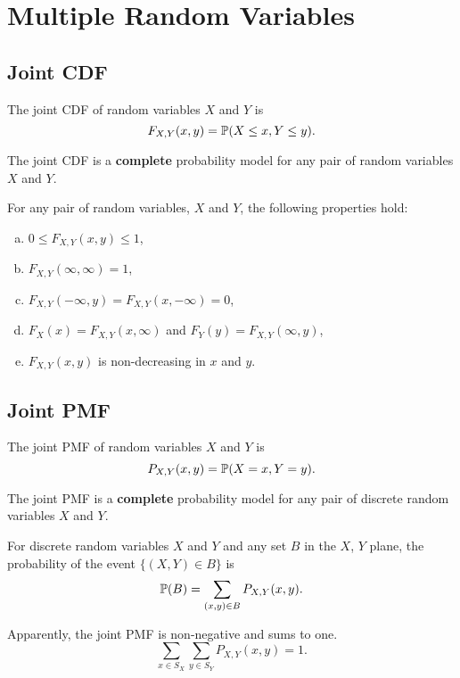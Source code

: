 \chapter{Multiple Random Variables}

\section{Joint CDF}
\begin{definition}
    The joint CDF of random variables $X$ and $Y$ is 
    \[F_{X,Y}(x,y) = \P{X\leq x, Y\leq y}.\]
\end{definition}

The joint CDF is a \textbf{complete} probability model for any pair of random variables $X$ and $Y$.

\begin{theorem}
    For any pair of random variables, $X$ and $Y$, the following properties hold:
    \begin{enumerate}[(a)]
        \item $0 \leq F_{X,Y}(x,y) \leq 1$,
        \item $F_{X,Y}(\infty,\infty)=1$,
        \item $F_{X,Y}(-\infty,y)=F_{X,Y}(x,-\infty)=0$,
        \item $F_X(x)=F_{X,Y}(x,\infty)$ and $F_Y(y)=F_{X,Y}(\infty,y)$,
        \item $F_{X,Y}(x,y)$ is non-decreasing in $x$ and $y$.
    \end{enumerate}
\end{theorem}

\section{Joint PMF}
\begin{definition}
    The joint PMF of random variables $X$ and $Y$ is 
    \[P_{X,Y}(x,y) = \P{X=x, Y=y}.\]    
\end{definition}

The joint PMF is a \textbf{complete} probability model for any pair of discrete random variables $X$ and $Y$.

\begin{theorem}
    For discrete random variables $X$ and $Y$ and any set $B$ in the $X$, $Y$ plane, the probability of the event $\{(X,Y)\in B\}$ is 
    \[\P{B}=\sum_{(x,y)\in B}P_{X,Y}(x,y).\]
\end{theorem}

Apparently, the joint PMF is non-negative and sums to one.
\[\sum_{x\in S_X}\sum_{y\in S_Y}P_{X,Y}(x,y)=1.\]


